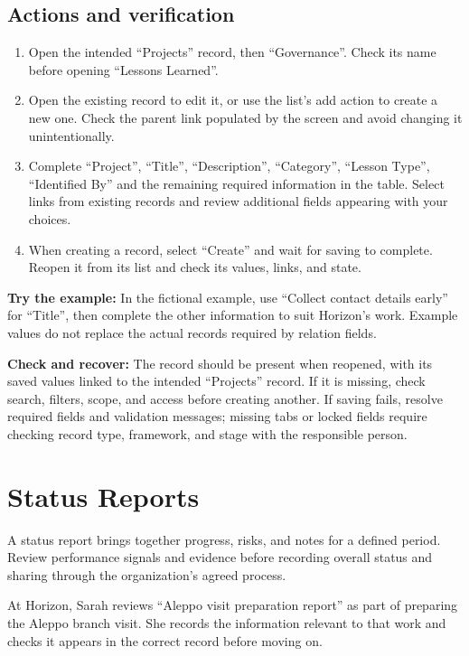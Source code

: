 \subsection{Actions and verification}
\begin{enumerate}
\item Open the intended “Projects” record, then “Governance”. Check its name before opening “Lessons Learned”.
\item Open the existing record to edit it, or use the list's add action to create a new one. Check the parent link populated by the screen and avoid changing it unintentionally.
\item Complete “Project”, “Title”, “Description”, “Category”, “Lesson Type”, “Identified By” and the remaining required information in the table. Select links from existing records and review additional fields appearing with your choices.
\item When creating a record, select “Create” and wait for saving to complete. Reopen it from its list and check its values, links, and state.
\end{enumerate}

\textbf{Try the example:} In the fictional example, use “Collect contact details early” for “Title”, then complete the other information to suit Horizon's work. Example values do not replace the actual records required by relation fields.

\textbf{Check and recover:} The record should be present when reopened, with its saved values linked to the intended “Projects” record. If it is missing, check search, filters, scope, and access before creating another. If saving fails, resolve required fields and validation messages; missing tabs or locked fields require checking record type, framework, and stage with the responsible person.

\clearpage
\section{Status Reports}
\label{sec:projects-feature-status-reports}

A status report brings together progress, risks, and notes for a defined period. Review performance signals and evidence before recording overall status and sharing through the organization's agreed process.

\begin{rcnote}
At Horizon, Sarah reviews “Aleppo visit preparation report” as part of preparing the Aleppo branch visit. She records the information relevant to that work and checks it appears in the correct record before moving on.
\end{rcnote}

